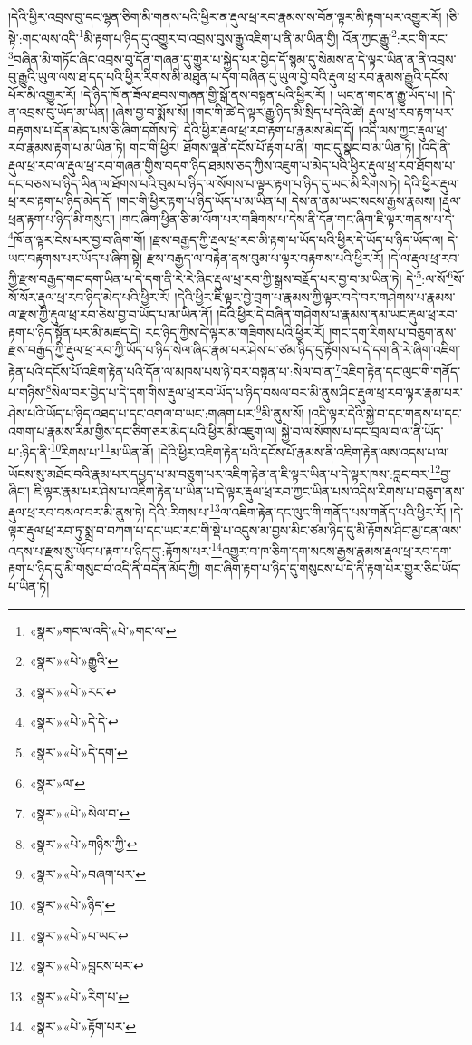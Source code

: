 །དེའི་ཕྱིར་འབྲས་བུ་དང་ལྷན་ཅིག་མི་གནས་པའི་ཕྱིར་ན་རྡུལ་ཕྲ་རབ་རྣམས་ས་བོན་ལྟར་མི་རྟག་པར་འགྱུར་རོ། །ཅི་སྟེ་:གང་ལས་འདི་\footnote{«སྣར་»གང་ལ་འདི་«པེ་»གང་ལ་}མི་རྟག་པ་ཉིད་དུ་འགྱུར་བ་འབྲས་བུས་རྒྱུ་འཇིག་པ་ནི་མ་ཡིན་གྱི། འོན་ཀྱང་རྒྱུ་\footnote{«སྣར་»«པེ་»རྒྱུའི་}:རང་གི་རང་\footnote{«སྣར་»«པེ་»རང་}བཞིན་མི་གཏོང་ཞིང་འབྲས་བུ་དོན་གཞན་དུ་གྱུར་པ་སྐྱེད་པར་བྱེད་དོ་སྙམ་དུ་སེམས་ན་དེ་ལྟར་ཡིན་ན་ནི་འབྲས་བུ་རྒྱུའི་ཡུལ་ལས་ཐ་དད་པའི་ཕྱིར་རིགས་མི་མཐུན་པ་དག་བཞིན་དུ་ཡུལ་བྱེ་བའི་རྡུལ་ཕྲ་རབ་རྣམས་རྒྱུའི་དངོས་པོར་མི་འགྱུར་རོ། །དེ་ཉིད་ཁོ་ན་ཟོལ་ཐབས་གཞན་གྱི་སྒོ་ནས་བསྟན་པའི་ཕྱིར་རོ། །
ཡང་ན་གང་ན་རྒྱུ་ཡོད་པ། །དེ་ན་འབྲས་བུ་ཡོད་མ་ཡིན། །ཞེས་བྱ་བ་སྨོས་སོ། །གང་གི་ཚེ་དེ་ལྟར་རྒྱུ་ཉིད་མི་སྲིད་པ་དེའི་ཚེ། རྡུལ་ཕྲ་རབ་རྟག་པར་བརྟགས་པ་དོན་མེད་པས་ཅི་ཞིག་དགོས་ཏེ། དེའི་ཕྱིར་རྡུལ་ཕྲ་རབ་རྟག་པ་རྣམས་མེད་དོ། །འདི་ལས་ཀྱང་རྡུལ་ཕྲ་རབ་རྣམས་རྟག་པ་མ་ཡིན་ཏེ། གང་གི་ཕྱིར། ཐོགས་ལྡན་དངོས་པོ་རྟག་པ་ནི། །གང་དུ་སྣང་བ་མ་ཡིན་ཏེ། །འདི་ནི་རྡུལ་ཕྲ་རབ་ལ་རྡུལ་ཕྲ་རབ་གཞན་གྱིས་བདག་ཉིད་ཐམས་ཅད་ཀྱིས་འཇུག་པ་མེད་པའི་ཕྱིར་རྡུལ་ཕྲ་རབ་ཐོགས་པ་དང་བཅས་པ་ཉིད་ཡིན་ལ་ཐོགས་པའི་བུམ་པ་ཉིད་ལ་སོགས་པ་ལྟར་རྟག་པ་ཉིད་དུ་ཡང་མི་རིགས་ཏེ། དེའི་ཕྱིར་རྡུལ་ཕྲ་རབ་རྟག་པ་ཉིད་མེད་དོ། །གང་གི་ཕྱིར་རྟག་པ་ཉིད་ཡོད་པ་མ་ཡིན་པ། དེས་ན་ནམ་ཡང་སངས་རྒྱས་རྣམས། །རྡུལ་ཕྲན་རྟག་པ་ཉིད་མི་གསུང་། །གང་ཞིག་ཕྱིན་ཅི་མ་ལོག་པར་གཟིགས་པ་དེས་ནི་དོན་གང་ཞིག་ཇི་ལྟར་གནས་པ་དེ་\footnote{«སྣར་»«པེ་»དེ་དེ་}ཁོ་ན་ལྟར་ངེས་པར་བྱ་བ་ཞིག་གོ། །རྫས་བརྒྱད་ཀྱི་རྡུལ་ཕྲ་རབ་མི་རྟག་པ་ཡོད་པའི་ཕྱིར་དེ་ཡོད་པ་ཉིད་ཡོད་ལ། དེ་ཡང་བརྟགས་པར་ཡོད་པ་ཞིག་སྟེ། རྫས་བརྒྱད་ལ་བརྟེན་ནས་བུམ་པ་ལྟར་བརྟགས་པའི་ཕྱིར་རོ། །དེ་ལ་རྡུལ་ཕྲ་རབ་ཀྱི་རྫས་བརྒྱད་གང་དག་ཡིན་པ་དེ་དག་ནི་རེ་རེ་ཞིང་རྡུལ་ཕྲ་རབ་ཀྱི་སྒྲས་བརྗོད་པར་བྱ་བ་མ་ཡིན་ཏེ། དེ་\footnote{«སྣར་»«པེ་»དེ་དག་}:ལ་སོ་\footnote{«སྣར་»ལ་}སོ་སོ་སོར་རྡུལ་ཕྲ་རབ་ཉིད་མེད་པའི་ཕྱིར་རོ། །དེའི་ཕྱིར་ཇི་ལྟར་བྱེ་བྲག་པ་རྣམས་ཀྱི་ལྟར་བདེ་བར་གཤེགས་པ་རྣམས་ལ་རྫས་ཀྱི་རྡུལ་ཕྲ་རབ་ཅེས་བྱ་བ་ཡོད་པ་མ་ཡིན་ནོ། །དེའི་ཕྱིར་དེ་བཞིན་གཤེགས་པ་རྣམས་ནམ་ཡང་རྡུལ་ཕྲ་རབ་རྟག་པ་ཉིད་སྟོན་པར་མི་མཛད་དེ། རང་ཉིད་ཀྱིས་དེ་ལྟར་མ་གཟིགས་པའི་ཕྱིར་རོ། །གང་དག་རིགས་པ་བཅུག་ནས་རྫས་བརྒྱད་ཀྱི་རྡུལ་ཕྲ་རབ་ཀྱི་ཡོད་པ་ཉིད་སེལ་ཞིང་རྣམ་པར་ཤེས་པ་ཙམ་ཉིད་དུ་རྟོགས་པ་དེ་དག་ནི་རེ་ཞིག་འཇིག་རྟེན་པའི་དངོས་པོ་འཇིག་རྟེན་པའི་དོན་ལ་མཁས་པས་ཉེ་བར་བསྟན་པ་:སེལ་བ་ན་\footnote{«སྣར་»«པེ་»སེལ་བ་}འཇིག་རྟེན་དང་ལུང་གི་གནོད་པ་གཉིས་\footnote{«སྣར་»«པེ་»གཉིས་ཀྱི་}སེལ་བར་བྱེད་པ་དེ་དག་གིས་རྡུལ་ཕྲ་རབ་ཡོད་པ་ཉིད་བསལ་བར་མི་ནུས་ཤིང་རྡུལ་ཕྲ་རབ་ལྟར་རྣམ་པར་ཤེས་པའི་ཡོད་པ་ཉིད་འཐད་པ་དང་འགལ་བ་ཡང་:གཞག་པར་\footnote{«སྣར་»«པེ་»བཞག་པར་}མི་ནུས་སོ། །འདི་ལྟར་དེའི་སྐྱེ་བ་དང་གནས་པ་དང་འགག་པ་རྣམས་རིམ་གྱིས་དང་ཅིག་ཅར་མེད་པའི་ཕྱིར་མི་འཇུག་ལ། སྐྱེ་བ་ལ་སོགས་པ་དང་བྲལ་བ་ལ་ནི་ཡོད་པ་:ཉིད་ནི་\footnote{«སྣར་»«པེ་»ཉིད་}རིགས་པ་\footnote{«སྣར་»«པེ་»པ་ཡང་}མ་ཡིན་ནོ། །དེའི་ཕྱིར་འཇིག་རྟེན་པའི་དངོས་པོ་རྣམས་ནི་འཇིག་རྟེན་ལས་འདས་པ་ལ་ཡོངས་སུ་མཐོང་བའི་རྣམ་པར་དཔྱད་པ་མ་བཅུག་པར་འཇིག་རྟེན་ན་ཇི་ལྟར་ཡིན་པ་དེ་ལྟར་ཁས་:བླང་བར་\footnote{«སྣར་»«པེ་»བླངས་པར་}བྱ་ཞིང་། ཇི་ལྟར་རྣམ་པར་ཤེས་པ་འཇིག་རྟེན་པ་ཡིན་པ་དེ་ལྟར་རྡུལ་ཕྲ་རབ་ཀྱང་ཡིན་པས་འདིས་རིགས་པ་བཅུག་ནས་རྡུལ་ཕྲ་རབ་བསལ་བར་མི་ནུས་ཏེ། དེའི་:རིགས་པ་\footnote{«སྣར་»«པེ་»རིག་པ་}ལ་འཇིག་རྟེན་དང་ལུང་གི་གནོད་པས་གནོད་པའི་ཕྱིར་རོ། །དེ་ལྟར་རྡུལ་ཕྲ་རབ་ཏུ་སྨྲ་བ་བཀག་པ་དང་ཡང་རང་གི་སྡེ་པ་འདུས་མ་བྱས་མིང་ཙམ་ཉིད་དུ་མི་རྟོགས་ཤིང་མྱ་ངན་ལས་འདས་པ་རྫས་སུ་ཡོད་པ་རྟག་པ་ཉིད་དུ་:རྟོགས་པར་\footnote{«སྣར་»«པེ་»རྟོག་པར་}འགྱུར་བ་ཁ་ཅིག་དག་སངས་རྒྱས་རྣམས་རྡུལ་ཕྲ་རབ་དག་རྟག་པ་ཉིད་དུ་མི་གསུང་བ་འདི་ནི་བདེན་མོད་ཀྱི། གང་ཞིག་རྟག་པ་ཉིད་དུ་གསུངས་པ་དེ་ནི་རྟག་པར་གྱུར་ཅིང་ཡོད་པ་ཡིན་ཏེ། 